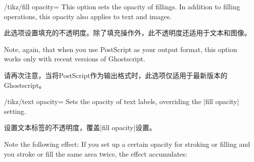\begin{key}{/tikz/fill opacity=}
    This option sets the opacity of fillings. In addition to filling
    operations, this opacity also applies to text and images.

    此选项设置填充的不透明度。除了填充操作外，此不透明度还适用于文本和图像。

    Note, again, that when you use PostScript as your output format, this
    option works only with recent versions of Ghostscript.

    请再次注意，当将PostScript作为输出格式时，此选项仅适用于最新版本的Ghostscript。
\begin{codeexample}[]
\end{codeexample}

\begin{codeexample}[]
\end{codeexample}
\end{key}

\begin{key}{/tikz/text opacity=}
    Sets the opacity of text labels, overriding the |fill opacity| setting.
    
    设置文本标签的不透明度，覆盖|fill opacity|设置。

\begin{codeexample}[]
\end{codeexample}
\end{key}

Note the following effect: If you set up a certain opacity for stroking or
filling and you stroke or fill the same area twice, the effect accumulates:


